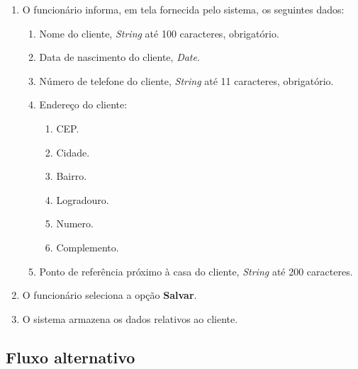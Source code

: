 \begin{enumerate}
	\item O funcionário informa, em tela fornecida pelo sistema, os seguintes dados:
	\begin{enumerate}
		\item Nome do cliente, \emph{String} até 100 caracteres, obrigatório.
		\item Data de nascimento do cliente, \emph{Date}.
		\item Número de telefone do cliente, \emph{String} até 11 caracteres, obrigatório.
		\item Endereço do cliente:
		\begin{enumerate}
			\item CEP.
			\item Cidade.
			\item Bairro.
			\item Logradouro.
			\item Numero.
			\item Complemento.
		\end{enumerate}
		\item Ponto de referência próximo à casa do cliente, \emph{String} até 200 caracteres.
	\end{enumerate}
	\item O funcionário seleciona a opção \textbf{Salvar}. 
	\item O sistema armazena os dados relativos ao cliente.
\end{enumerate}

\subsection{Fluxo alternativo}

